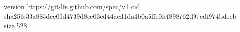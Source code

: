 version https://git-lfs.github.com/spec/v1
oid sha256:33a883dce00d4739d8ee03ed44aed1da4b0a5ffe0fef898762d97cdf974bdecb
size 528
